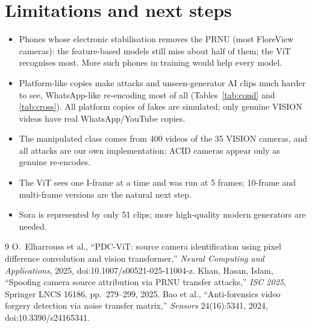 \documentclass[11pt,a4paper]{article}
\begin{document}
\section{Limitations and next steps}\begin{itemize}
\item Phones whose electronic stabilisation removes the PRNU (most FloreView cameras): the feature-based models still
      miss about half of them; the ViT recognises most. More such phones in training would help every model.
\item Platform-like copies make attacks and unseen-generator AI clips much harder to see, WhatsApp-like re-encoding most
      of all (Tables~\ref{tab:cond} and \ref{tab:cross}). All platform copies of fakes are simulated; only genuine VISION
      videos have real WhatsApp/YouTube copies.
\item The manipulated class comes from 400 videos of the 35 VISION cameras, and all attacks are our own implementation;
      ACID cameras appear only as genuine re-encodes.
\item The ViT sees one I-frame at a time and was run at 5 frames; 10-frame and multi-frame versions are the natural next step.
\item Sora is represented by only 51 clips; more high-quality modern generators are needed.
\end{itemize}
\begin{thebibliography}{9}
 O.~Elharrouss et al., ``PDC-ViT: source camera identification using pixel difference convolution and
  vision transformer,'' \emph{Neural Computing and Applications}, 2025, doi:10.1007/s00521-025-11004-z.
 Khan, Hasan, Islam, ``Spoofing camera source attribution via PRNU transfer attacks,''
  \emph{ISC 2025}, Springer LNCS 16186, pp.~279--299, 2025.
 Bao et al., ``Anti-forensics video forgery detection via noise transfer matrix,''
  \emph{Sensors} 24(16):5341, 2024, doi:10.3390/s24165341.
\end{thebibliography}
\end{document}

